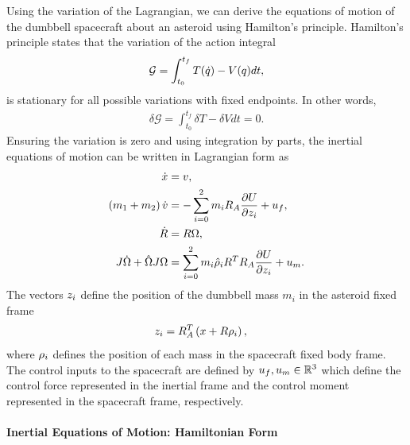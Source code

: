 Using the variation of the Lagrangian, we can derive the equations of motion of the dumbbell spacecraft about an asteroid using Hamilton's principle. 
Hamilton's principle states that the variation of the action integral
\begin{align}\label{eq:action_integral}
    \mathcal{G} = \int_{t_0}^{t_f} T(\dot{q}) - V(q) dt,
\end{align}
is stationary for all possible variations with fixed endpoints. 
In other words, 
\begin{align}\label{eq:hamiltons_principle}
    \delta \mathcal{G}  = \int_{t_0}^{t_f} \delta T - \delta V dt = 0.
\end{align}
Ensuring the variation is zero and using integration by parts, the inertial equations of motion can be written in Lagrangian form as
\begin{align}
    \dot{x} &= v, \label{eq:inertial_position_dynamics}\\
    \left( m_1 + m_2 \right) \dot{v} &= - \sum_{i=0}^2 m_i R_A \frac{\partial U}{\partial z_i} + u_f, \label{eq:inertial_velocity_dynamics}\\
    \dot{R} &= R \Omega, \label{eq:inertial_attitude_dynamics}\\
    J \dot{\Omega} + \hat{\Omega} J \Omega &= \sum_{i=0}^2 m_i \hat{\rho}_i R^T R_A \frac{\partial U}{\partial z_i} + u_m. \label{eq:inertial_angvel_dynamics}
\end{align}
The vectors \( z_i \) define the position of the dumbbell mass \( m_i \) in the asteroid fixed frame
\begin{align}\label{eq:mass_asteroid_frame}
    z_i &= R_A^T \left( x + R \rho_i \right),
\end{align}
where \( \rho_i \) defines the position of each mass in the spacecraft fixed body frame.
The control inputs to the spacecraft are defined by \( u_f, u_m \in \mathbb{R}^3 \) which define the control force represented in the inertial frame and the control moment represented in the spacecraft frame, respectively. 

\paragraph{Inertial Equations of Motion: Hamiltonian Form}\label{sec:inertial_hamiltonian_form}

